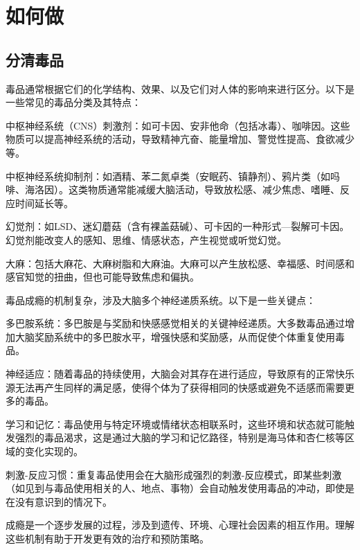 \documentclass[10pt,a4paper]{beamer} %
\begin{document}
	\section{如何做}
		\subsection{分清毒品}
		\begin{frame}
		毒品通常根据它们的化学结构、效果、以及它们对人体的影响来进行区分。以下是一些常见的毒品分类及其特点：
		
		中枢神经系统（CNS）刺激剂：如可卡因、安非他命（包括冰毒）、咖啡因。这些物质可以提高神经系统的活动，导致精神亢奋、能量增加、警觉性提高、食欲减少等。
		
		中枢神经系统抑制剂：如酒精、苯二氮卓类（安眠药、镇静剂）、鸦片类（如吗啡、海洛因）。这类物质通常能减缓大脑活动，导致放松感、减少焦虑、嗜睡、反应时间延长等。
		
		幻觉剂：如LSD、迷幻蘑菇（含有裸盖菇碱）、可卡因的一种形式—裂解可卡因。幻觉剂能改变人的感知、思维、情感状态，产生视觉或听觉幻觉。
		
		大麻：包括大麻花、大麻树脂和大麻油。大麻可以产生放松感、幸福感、时间感和感官知觉的扭曲，但也可能导致焦虑和偏执。
		\end{frame}
		\begin{frame}
			毒品成瘾的机制复杂，涉及大脑多个神经递质系统。以下是一些关键点：
			
			多巴胺系统：多巴胺是与奖励和快感感觉相关的关键神经递质。大多数毒品通过增加大脑奖励系统中的多巴胺水平，增强快感和奖励感，从而促使个体重复使用毒品。
			
			神经适应：随着毒品的持续使用，大脑会对其存在进行适应，导致原有的正常快乐源无法再产生同样的满足感，使得个体为了获得相同的快感或避免不适感而需要更多的毒品。
			
			学习和记忆：毒品使用与特定环境或情绪状态相联系时，这些环境和状态就可能触发强烈的毒品渴求，这是通过大脑的学习和记忆路径，特别是海马体和杏仁核等区域的变化实现的。
			
			刺激-反应习惯：重复毒品使用会在大脑形成强烈的刺激-反应模式，即某些刺激（如见到与毒品使用相关的人、地点、事物）会自动触发使用毒品的冲动，即使是在没有意识到的情况下。
			
			成瘾是一个逐步发展的过程，涉及到遗传、环境、心理社会因素的相互作用。理解这些机制有助于开发更有效的治疗和预防策略。

		\end{frame}
		
\end{document}
